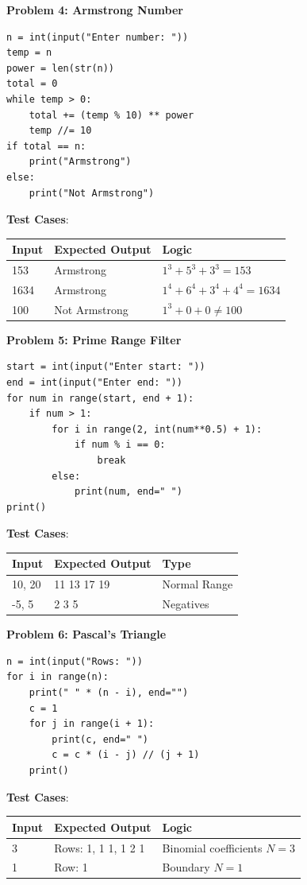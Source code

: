\begin{solutionbox}
\vspace{10pt}
\noindent\textbf{Problem 4: Armstrong Number}
\begin{lstlisting}[language=Python3]
n = int(input("Enter number: "))
temp = n
power = len(str(n))
total = 0
while temp > 0:
    total += (temp % 10) ** power
    temp //= 10
if total == n:
    print("Armstrong")
else:
    print("Not Armstrong")
\end{lstlisting}
\textbf{Test Cases}:
\begin{tabular}{|l|l|l|}
\hline Input & Expected Output & Logic \\
\hline 153 & Armstrong & $1^3+5^3+3^3 = 153$ \\
\hline 1634 & Armstrong & $1^4+6^4+3^4+4^4 = 1634$ \\
\hline 100 & Not Armstrong & $1^3+0+0 \neq 100$ \\
\hline
\end{tabular}

\vspace{10pt}
\noindent\textbf{Problem 5: Prime Range Filter}
\begin{lstlisting}[language=Python3]
start = int(input("Enter start: "))
end = int(input("Enter end: "))
for num in range(start, end + 1):
    if num > 1:
        for i in range(2, int(num**0.5) + 1):
            if num % i == 0:
                break
        else:
            print(num, end=" ")
print()
\end{lstlisting}
\textbf{Test Cases}:
\begin{tabular}{|l|l|l|}
\hline Input & Expected Output & Type \\
\hline 10, 20 & 11 13 17 19 & Normal Range \\
\hline -5, 5 & 2 3 5 & Negatives \\
\hline
\end{tabular}

\vspace{10pt}
\noindent\textbf{Problem 6: Pascal's Triangle}
\begin{lstlisting}[language=Python3]
n = int(input("Rows: "))
for i in range(n):
    print(" " * (n - i), end="")
    c = 1
    for j in range(i + 1):
        print(c, end=" ")
        c = c * (i - j) // (j + 1)
    print()
\end{lstlisting}
\textbf{Test Cases}:
\begin{tabular}{|l|l|l|}
\hline Input & Expected Output & Logic \\
\hline 3 & Rows: 1, 1 1, 1 2 1 & Binomial coefficients $N=3$ \\
\hline 1 & Row: 1 & Boundary $N=1$ \\
\hline
\end{tabular}


\end{solutionbox}
